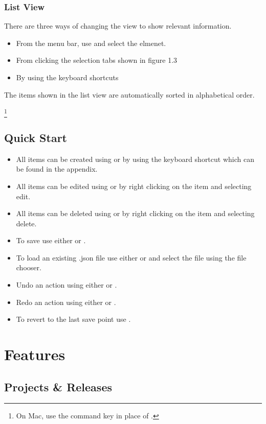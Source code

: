 \documentclass[11pt,fleqn]{book} %
\begin{document}
\subsection{List View}
There are three ways of changing the view to show relevant information.
\begin{itemize}
  \item From the menu bar, use  and select the elmenet.
  \item From clicking the selection tabs shown in figure 1.3
  \item By using the keyboard shortcuts 
\end{itemize}
The items shown in the list view are automatically sorted in alphabetical order.

\footnote{On Mac, use the command key \keys{\cmd} in place of \keys{\ctrl}.}\\

\section{Quick Start}
\begin{itemize}
    \item All items can be created using  or by using the keyboard shortcut which can be found
    in the appendix.
    \item All items can be edited using  or by right clicking on the item and selecting edit.
    \item All items can be deleted using  or by right clicking on the item and selecting delete.
    \item To save use either  or .
    \item To load an existing .json file use either  or  and select the file using the file chooser.
    \item Undo an action using either  or .
    \item Redo an action using either  or .
    \item To revert to the last save point use .
\end{itemize}

\chapter{Features}
\section{Projects \& Releases}
\end{document}
